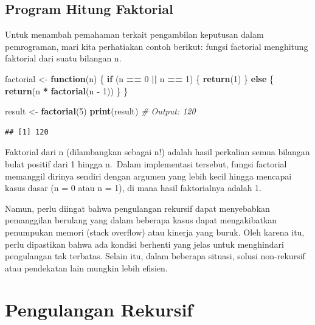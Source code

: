\documentclass[
]{book}
\newenvironment{Shaded}{\begin{snugshade}}{\end{snugshade}}
\newcommand{\CommentTok}[1]{\textcolor[rgb]{0.56,0.35,0.01}{\textit{#1}}}
\newcommand{\ControlFlowTok}[1]{\textcolor[rgb]{0.13,0.29,0.53}{\textbf{#1}}}
\newcommand{\DecValTok}[1]{\textcolor[rgb]{0.00,0.00,0.81}{#1}}
\newcommand{\FunctionTok}[1]{\textcolor[rgb]{0.13,0.29,0.53}{\textbf{#1}}}
\newcommand{\NormalTok}[1]{#1}
\newcommand{\OtherTok}[1]{\textcolor[rgb]{0.56,0.35,0.01}{#1}}
\newcommand{\SpecialCharTok}[1]{\textcolor[rgb]{0.81,0.36,0.00}{\textbf{#1}}}
\begin{document}
\hypertarget{program-hitung-faktorial}{%
\subsection{Program Hitung Faktorial}\label{program-hitung-faktorial}}

Untuk menambah pemahaman terkait pengambilan keputusan dalam pemrograman, mari kita perhatiakan contoh berikut: fungsi factorial menghitung faktorial dari suatu bilangan n.

\begin{Shaded}
\begin{Highlighting}[]
\NormalTok{factorial }\OtherTok{\textless{}{-}} \ControlFlowTok{function}\NormalTok{(n) \{}
  \ControlFlowTok{if}\NormalTok{ (n }\SpecialCharTok{==} \DecValTok{0} \SpecialCharTok{||}\NormalTok{ n }\SpecialCharTok{==} \DecValTok{1}\NormalTok{) \{}
    \FunctionTok{return}\NormalTok{(}\DecValTok{1}\NormalTok{)}
\NormalTok{  \} }\ControlFlowTok{else}\NormalTok{ \{}
    \FunctionTok{return}\NormalTok{(n }\SpecialCharTok{*} \FunctionTok{factorial}\NormalTok{(n }\SpecialCharTok{{-}} \DecValTok{1}\NormalTok{))}
\NormalTok{  \}}
\NormalTok{\}}

\NormalTok{result }\OtherTok{\textless{}{-}} \FunctionTok{factorial}\NormalTok{(}\DecValTok{5}\NormalTok{)}
\FunctionTok{print}\NormalTok{(result)  }\CommentTok{\# Output: 120}
\end{Highlighting}
\end{Shaded}

\begin{verbatim}
## [1] 120
\end{verbatim}

Faktorial dari n (dilambangkan sebagai n!) adalah hasil perkalian semua bilangan bulat positif dari 1 hingga n.~Dalam implementasi tersebut, fungsi factorial memanggil dirinya sendiri dengan argumen yang lebih kecil hingga mencapai kasus dasar (n = 0 atau n = 1), di mana hasil faktorialnya adalah 1.

Namun, perlu diingat bahwa pengulangan rekursif dapat menyebabkan pemanggilan berulang yang dalam beberapa kasus dapat mengakibatkan penumpukan memori (stack overflow) atau kinerja yang buruk. Oleh karena itu, perlu dipastikan bahwa ada kondisi berhenti yang jelas untuk menghindari pengulangan tak terbatas. Selain itu, dalam beberapa situasi, solusi non-rekursif atau pendekatan lain mungkin lebih efisien.

\hypertarget{pengulangan-rekursif}{%
\section{Pengulangan Rekursif}\label{pengulangan-rekursif}}
\end{document}
